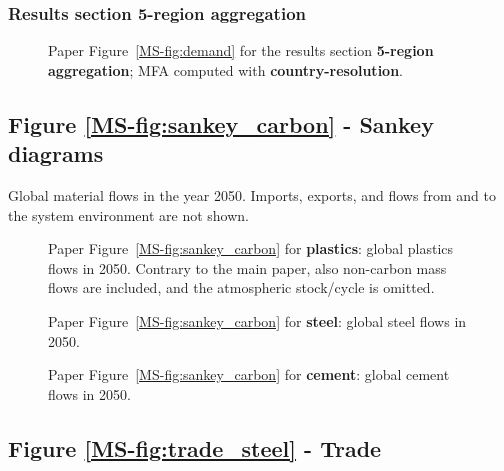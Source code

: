 \clearpage
\subsubsection{Results section 5-region aggregation}
\begin{figure}[htbp]
    \centering
    \caption{Paper Figure~\ref{MS-fig:demand} for the results section \textbf{5-region aggregation}; MFA computed with \textbf{country-resolution}.}
    \label{fig:figure_8_agg5_countries}
\end{figure}

\clearpage
\subsection{Figure \texorpdfstring{\ref{MS-fig:sankey_carbon}}{6} - Sankey diagrams} \label{sec:add_fig_9}

Global material flows in the year 2050.
Imports, exports, and flows from and to the system environment are not shown.

\begin{figure}[htbp]
    \centering
    \caption{Paper Figure~\ref{MS-fig:sankey_carbon} for \textbf{plastics}: global plastics flows in 2050. Contrary to the main paper, also non-carbon mass flows are included, and the atmospheric stock/cycle is omitted.}
    \label{fig:figure_9_plastics}
\end{figure}

\begin{figure}[htbp]
    \centering
    \caption{Paper Figure~\ref{MS-fig:sankey_carbon} for \textbf{steel}: global steel flows in 2050.}
    \label{fig:figure_9_steel}
\end{figure}

\begin{figure}[htbp]
    \centering
    \caption{Paper Figure~\ref{MS-fig:sankey_carbon} for \textbf{cement}: global cement flows in 2050.}
    \label{fig:figure_9_cement}
\end{figure}

\clearpage
\subsection{Figure \texorpdfstring{\ref{MS-fig:trade_steel}}{7} - Trade} \label{sec:add_fig_10}

